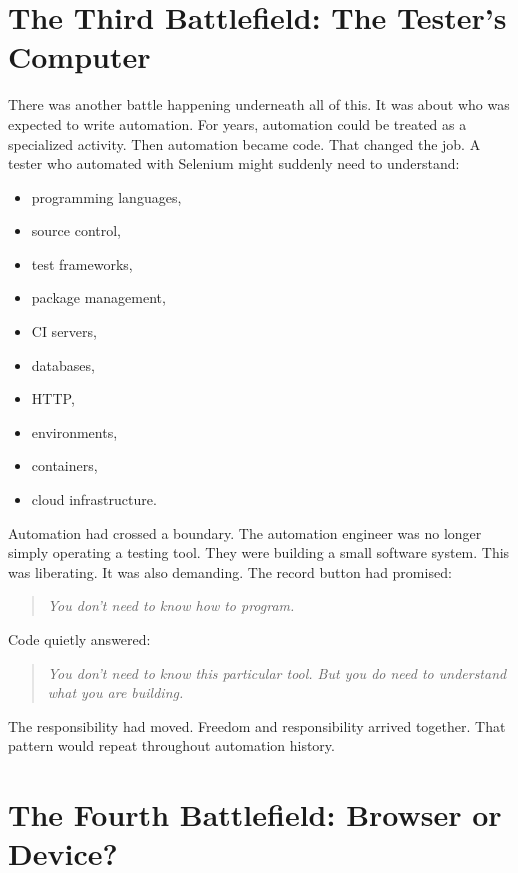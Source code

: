 \documentclass[11pt,twoside]{book}
\begin{document}
\section*{The Third Battlefield: The Tester's Computer}

There was another battle happening underneath all of this.
It was about who was expected to write automation.
For years, automation could be treated as a specialized activity.
Then automation became code.
That changed the job.
A tester who automated with Selenium might suddenly need to understand:
\begin{itemize}[nosep]
    \item programming languages,
    \item source control,
    \item test frameworks,
    \item package management,
    \item CI servers,
    \item databases,
    \item HTTP,
    \item environments,
    \item containers,
    \item cloud infrastructure.
\end{itemize}

Automation had crossed a boundary.
The automation engineer was no longer simply operating a testing tool.
They were building a small software system.
This was liberating.
It was also demanding.
The record button had promised:
\begin{quote}
\emph{You don't need to know how to program.}
\end{quote}
Code quietly answered:
\begin{quote}
\emph{You don't need to know this particular tool. But you do need to understand what you are building.}
\end{quote}
The responsibility had moved.
Freedom and responsibility arrived together.
That pattern would repeat throughout automation history.

\section*{The Fourth Battlefield: Browser or Device?}
\end{document}
